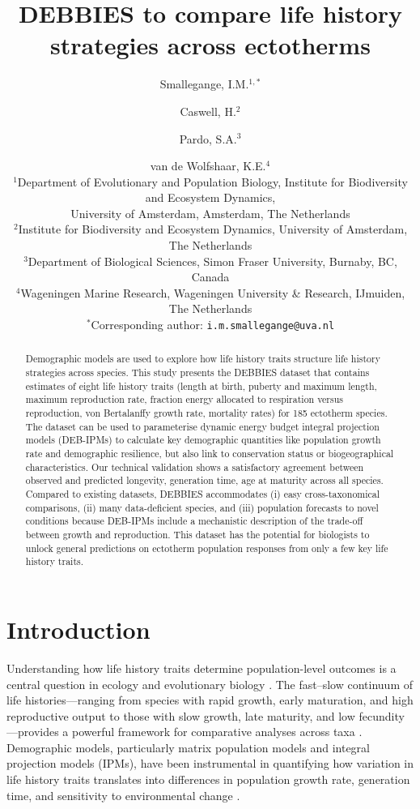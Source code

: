 \documentclass[11pt]{article}
\title{DEBBIES to compare life history strategies across ectotherms}
\author{
Smallegange, I.M.$^{1,*}$ \and Caswell, H.$^{2}$ \and Pardo, S.A.$^{3}$ \and van de Wolfshaar, K.E.$^{4}$\\[6pt]
\small $^{1}$Department of Evolutionary and Population Biology, Institute for Biodiversity and Ecosystem Dynamics,\\
\small University of Amsterdam, Amsterdam, The Netherlands\\
\small $^{2}$Institute for Biodiversity and Ecosystem Dynamics, University of Amsterdam, The Netherlands\\
\small $^{3}$Department of Biological Sciences, Simon Fraser University, Burnaby, BC, Canada\\
\small $^{4}$Wageningen Marine Research, Wageningen University \& Research, IJmuiden, The Netherlands\\
\small $^{*}$Corresponding author: \texttt{i.m.smallegange@uva.nl}
}
\date{}
\begin{document}
\maketitle

\begin{abstract}
Demographic models are used to explore how life history traits structure life history strategies across species. This study presents the DEBBIES dataset that contains estimates of eight life history traits (length at birth, puberty and maximum length, maximum reproduction rate, fraction energy allocated to respiration versus reproduction, von Bertalanffy growth rate, mortality rates) for 185 ectotherm species. The dataset can be used to parameterise dynamic energy budget integral projection models (DEB-IPMs) to calculate key demographic quantities like population growth rate and demographic resilience, but also link to conservation status or biogeographical characteristics. Our technical validation shows a satisfactory agreement between observed and predicted longevity, generation time, age at maturity across all species. Compared to existing datasets, DEBBIES accommodates (i) easy cross-taxonomical comparisons, (ii) many data-deficient species, and (iii) population forecasts to novel conditions because DEB-IPMs include a mechanistic description of the trade-off between growth and reproduction. This dataset has the potential for biologists to unlock general predictions on ectotherm population responses from only a few key life history traits.
\end{abstract}

\section{Introduction}

Understanding how life history traits determine population-level outcomes is a central question in ecology and evolutionary biology \citep{stearns1992, roff2002}. The fast--slow continuum of life histories---ranging from species with rapid growth, early maturation, and high reproductive output to those with slow growth, late maturity, and low fecundity---provides a powerful framework for comparative analyses across taxa \citep{salguero2016, salguero2017, charnov1993}. Demographic models, particularly matrix population models and integral projection models (IPMs), have been instrumental in quantifying how variation in life history traits translates into differences in population growth rate, generation time, and sensitivity to environmental change \citep{caswell2001, ellner2012, merow2014}.
\end{document}
